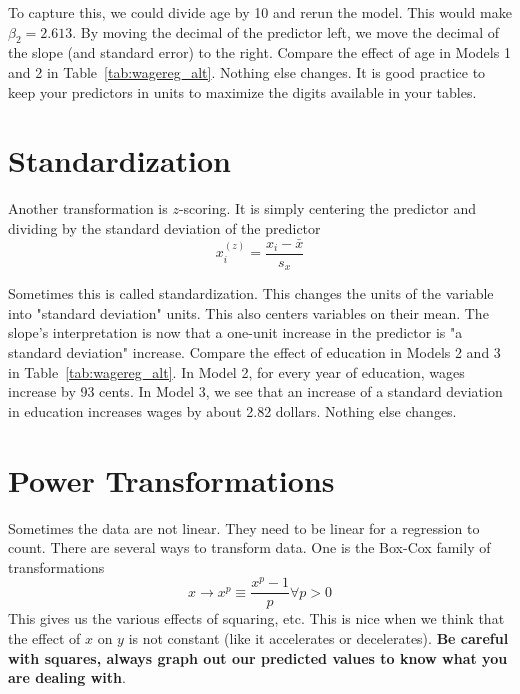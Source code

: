 To capture this, we could divide age by 10 and rerun the model. This would make $\beta_2=2.613$. By moving the decimal of the predictor left, we move the decimal of the slope (and standard error) to the right. Compare the effect of age in Models 1 and 2 in Table~\ref{tab:wagereg_alt}. Nothing else changes. It is good practice to keep your predictors in units to maximize the digits available in your tables.

\section{Standardization}

Another transformation is $z$-scoring. It is simply centering the predictor and dividing by the standard deviation of the predictor
\begin{equation}
x_i^{(z)}=\frac{x_i-\bar{x}}{s_x}
\end{equation}

Sometimes this is called standardization. This changes the units of the variable into "standard deviation" units. This also centers variables on their mean. The slope's interpretation is now that a one-unit increase in the predictor is "a standard deviation" increase. Compare the effect of education in Models 2 and 3 in Table~\ref{tab:wagereg_alt}. In Model 2, for every year of education, wages increase by 93 cents. In Model 3, we see that an increase of a standard deviation in education increases wages by about 2.82 dollars. Nothing else changes.


\section{Power Transformations}

Sometimes the data are not linear. They need to be linear for a regression to count. There are several ways to transform data. One is the Box-Cox family of transformations
\begin{equation}
x\rightarrow x^p\equiv\frac{x^p-1}{p}\forall p>0
\end{equation}
This gives us the various effects of squaring, etc. This is nice when we think that the effect of $x$ on $y$ is not constant (like it accelerates or decelerates). {\bf Be careful with squares, always graph out our predicted values to know what you are dealing with}.

